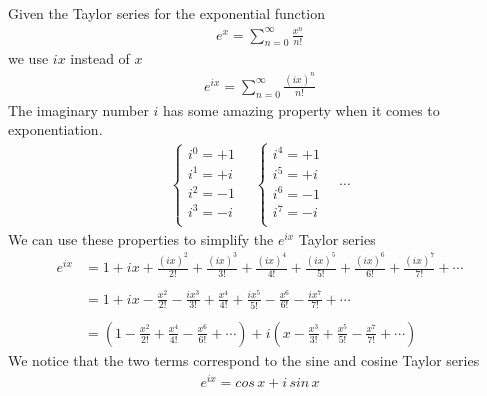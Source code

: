 \documentclass{article}
\begin{document}
Given the Taylor series for the exponential function
\begin{align*}
    e^x=\sum_{n=0}^{\infty}\frac{x^n}{n!}
\end{align*}
we use \(ix\) instead of \(x\)
\begin{align*}
    e^{ix}=\sum_{n=0}^{\infty}\frac{(ix)^n}{n!}
\end{align*}
The imaginary number \(i\) has some amazing property when it comes to exponentiation.
\begin{align*}
    \begin{cases}
        i^0=+1\\
        i^1=+i\\
        i^2=-1\\
        i^3=-i\\
    \end{cases}
    \quad
    \begin{cases}
        i^4=+1\\
        i^5=+i\\
        i^6=-1\\
        i^7=-i\\
    \end{cases}
    \quad
    \cdots
\end{align*}
We can use these properties to simplify the \(e^{ix}\) Taylor series
\begin{align*}
    e^{ix}
    &   =1
        +ix
        +\frac{(ix)^2}{2!}
        +\frac{(ix)^3}{3!}
        +\frac{(ix)^4}{4!}
        +\frac{(ix)^5}{5!}
        +\frac{(ix)^6}{6!}
        +\frac{(ix)^7}{7!}
        +\cdots
    \\
    \\
    &   =1
        +ix
        -\frac{x^2}{2!}
        -\frac{ix^3}{3!}
        +\frac{x^4}{4!}
        +\frac{ix^5}{5!}
        -\frac{x^6}{6!}
        -\frac{ix^7}{7!}
        +\cdots
    \\
    \\
    &=
    \left(
        1
        -\frac{x^2}{2!}
        +\frac{x^4}{4!}
        -\frac{x^6}{6!}
        +\cdots
    \right)
    +i
    \left(
        x
        -\frac{x^3}{3!}
        +\frac{x^5}{5!}
        -\frac{x^7}{7!}
        +\cdots
    \right)
\end{align*}
We notice that the two terms correspond to the sine and cosine Taylor series
\begin{align*}
    e^{ix}=cos\,x+i\,sin\,x
\end{align*}
\end{document}
